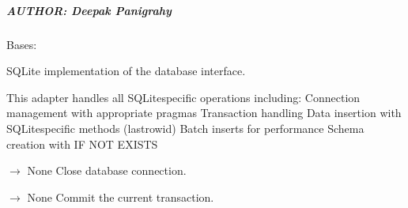 \documentclass[letterpaper,10pt,english]{sphinxmanual}
\begin{document}
\subparagraph{AUTHOR: Deepak Panigrahy}
\label{\detokenize{core.database.sqlite_adapter:author-deepak-panigrahy}}

\begin{fulllineitems}
\label{\detokenize{core.database.sqlite_adapter:core.database.sqlite_adapter.SQLiteAdapter}}
\pysigstartsignatures
\pysiglinewithargsret
{}
{}
{}
\pysigstopsignatures
\sphinxAtStartPar
Bases: {\hyperref[\detokenize{core.database.base:core.database.base.DatabaseInterface}]{}}

\sphinxAtStartPar
SQLite implementation of the database interface.

\sphinxAtStartPar
This adapter handles all SQLite\sphinxhyphen{}specific operations including:
\sphinxhyphen{} Connection management with appropriate pragmas
\sphinxhyphen{} Transaction handling
\sphinxhyphen{} Data insertion with SQLite\sphinxhyphen{}specific methods (lastrowid)
\sphinxhyphen{} Batch inserts for performance
\sphinxhyphen{} Schema creation with IF NOT EXISTS

\begin{fulllineitems}
\label{\detokenize{core.database.sqlite_adapter:core.database.sqlite_adapter.SQLiteAdapter.close}}
\pysigstartsignatures
\pysiglinewithargsret
{}
{}
{{ $\rightarrow$ None}}
\pysigstopsignatures
\sphinxAtStartPar
Close database connection.

\end{fulllineitems}


\begin{fulllineitems}
\label{\detokenize{core.database.sqlite_adapter:core.database.sqlite_adapter.SQLiteAdapter.commit}}
\pysigstartsignatures
\pysiglinewithargsret
{}
{}
{{ $\rightarrow$ None}}
\pysigstopsignatures
\sphinxAtStartPar
Commit the current transaction.


\end{fulllineitems}
\end{fulllineitems}
\end{document}
